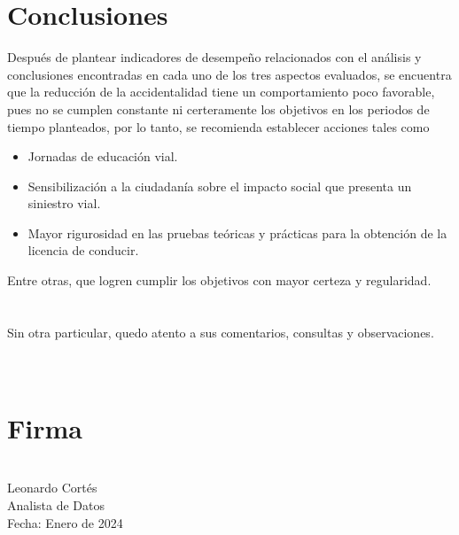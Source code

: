 \documentclass[12pt]{article}
\begin{document}
\section{Conclusiones}
Después de plantear indicadores de desempeño relacionados con el análisis y conclusiones encontradas en cada uno de los tres aspectos evaluados, se encuentra que la reducción de la accidentalidad tiene un comportamiento poco favorable, pues no se cumplen constante ni  certeramente los objetivos en los periodos de tiempo planteados, por lo tanto, se recomienda establecer acciones tales como 
\begin{itemize}
    \item Jornadas de educación vial.
    
    \item Sensibilización a la ciudadanía sobre el impacto social que presenta un siniestro vial.
    
    \item Mayor rigurosidad en las pruebas teóricas y prácticas para la obtención de la licencia de conducir.
    
\end{itemize}
Entre otras, que logren cumplir los objetivos con mayor certeza y regularidad. 
\\
\\
\\
Sin otra particular, quedo atento a sus comentarios, consultas y observaciones.
\\
\\
\\
\section*{Firma}

\\

Leonardo Cortés\\
Analista de Datos \\
Fecha: Enero de 2024
\end{document}
